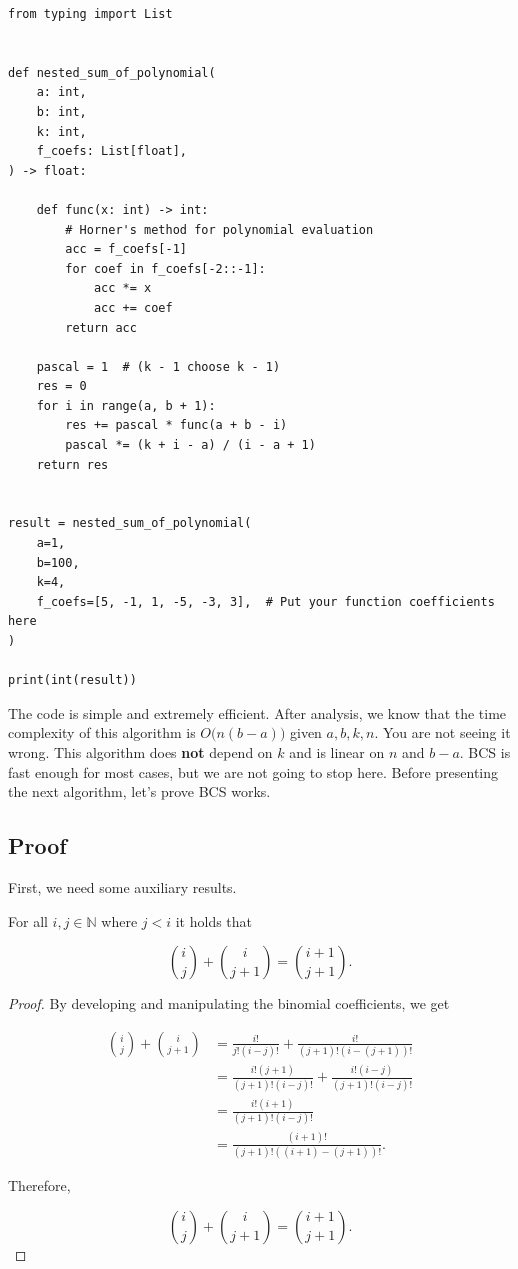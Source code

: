 \documentclass[12pt]{article}
\begin{document}
\begin{lstlisting}[style=Python]
from typing import List


def nested_sum_of_polynomial(
    a: int,
    b: int,
    k: int,
    f_coefs: List[float],
) -> float:

    def func(x: int) -> int:
        # Horner's method for polynomial evaluation
        acc = f_coefs[-1]
        for coef in f_coefs[-2::-1]:
            acc *= x
            acc += coef
        return acc

    pascal = 1  # (k - 1 choose k - 1)
    res = 0
    for i in range(a, b + 1):
        res += pascal * func(a + b - i)
        pascal *= (k + i - a) / (i - a + 1)
    return res


result = nested_sum_of_polynomial(
    a=1,
    b=100,
    k=4,
    f_coefs=[5, -1, 1, -5, -3, 3],  # Put your function coefficients here
)

print(int(result)) 
\end{lstlisting}

The code is simple and extremely efficient. After analysis, we know that the time complexity of this algorithm is $O\Big(n (b - a)\Big)$ given $a, b, k, n$. You are not seeing it wrong. This algorithm does \textbf{not} depend on $k$ and is linear on $n$ and $b-a$. BCS is fast enough for most cases, but we are not going to stop here. Before presenting the next algorithm, let's prove BCS works.

\subsection{Proof}

First, we need some auxiliary results.

\begin{theorem}
    \label{pascal_rule}

    For all $i, j \in \mathbb{N}$ where $j < i$ it holds that

    $$
        \binom{i}{j} + \binom{i}{j+1} = \binom{i+1}{j+1}.
    $$

\end{theorem}

\begin{proof}

    By developing and manipulating the binomial coefficients, we get

    \begin{align*}
        \binom{i}{j} + \binom{i}{j+1} & = \frac{i!}{j!(i-j)!} + \frac{i!}{(j+1)!(i-(j+1))!}           \\
                                      & = \frac{i!(j+1)}{(j+1)!(i-j)!} + \frac{i!(i-j)}{(j+1)!(i-j)!} \\
                                      & = \frac{i!(i+1)}{(j+1)!(i-j)!}                                \\
                                      & = \frac{(i+1)!}{(j+1)!((i+1)-(j+1))!}.
    \end{align*}

    Therefore,

    $$
        \boxed{\binom{i}{j} + \binom{i}{j+1} = \binom{i+1}{j+1}}.
    $$

\end{proof}
\end{document}
